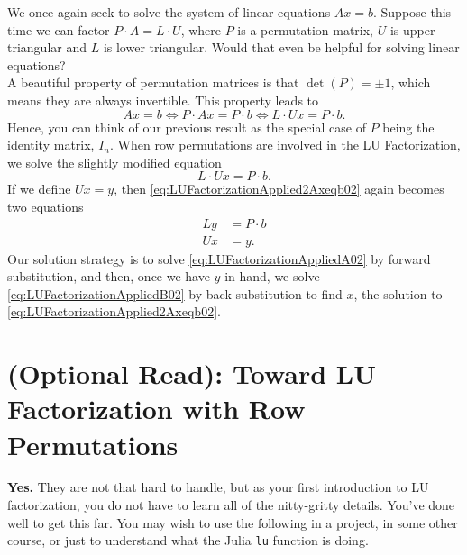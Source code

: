 \begin{tcolorbox}[title=\textbf{\large Solving $\mathbf{Ax=b}$ \textcolor{red}{\bf via LU} with \textcolor{red}{\bf Row Permutations}}]
We once again seek to solve the system of linear equations $Ax=b$. Suppose this time we can factor $P \cdot A=L \cdot U$, where $P$ is a permutation matrix, $U$ is upper triangular and $L$ is lower triangular. Would that even be helpful for solving linear equations? \\

 A beautiful property of permutation matrices is that $\det(P)=\pm 1$, which means they are always invertible. This property leads to
 $$Ax = b \iff P \cdot A x = P \cdot b \iff L \cdot U x = P \cdot b. $$
 Hence, you can think of our previous result as the special case of $P$ being the identity matrix, $I_n$. When row permutations are involved in the LU Factorization, we solve the slightly modified equation
\begin{equation}
\label{eq:LUFactorizationApplied2Axeqb02}
  L \cdot U x = P \cdot b.  
\end{equation} 
If we define $Ux=y$, then \eqref{eq:LUFactorizationApplied2Axeqb02} again becomes two equations
\begin{align}
  \label{eq:LUFactorizationAppliedA02}
  L y &= P\cdot b \\
    \label{eq:LUFactorizationAppliedB02}
 U x &=y.
\end{align}
Our solution strategy is to solve \eqref{eq:LUFactorizationAppliedA02} by forward substitution, and then, once we have $y$ in hand, we solve \eqref{eq:LUFactorizationAppliedB02}
by back substitution to find $x$, the solution to \eqref{eq:LUFactorizationApplied2Axeqb02}.
\end{tcolorbox}

\section{(Optional Read): Toward LU Factorization with Row Permutations}
\label{sec:LUwithRowPermutations}

\begin{tcolorbox}[sharp corners, colback=green!30, colframe=green!80!blue, title=\textbf{\large Are there Cases where our Simplified LU Factorization Process Fails?}]
 \textbf{Yes.} They are not that hard to handle, but as your first introduction to LU factorization, you do not have to learn all of the nitty-gritty details. You've done well to get this far. You may wish to use the following in a project, in some other course, or just to understand what the Julia \texttt{lu} function is doing.
\end{tcolorbox}
\vspace*{.7cm}

